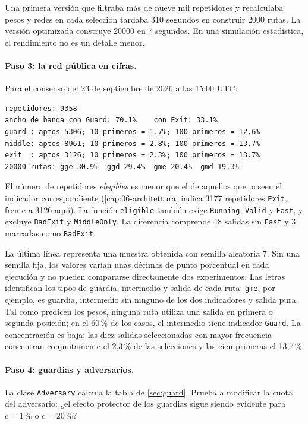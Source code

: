 Una primera versión que filtraba más de nueve mil repetidores y recalculaba pesos y redes en cada selección tardaba 310 segundos en construir \num{2000} rutas. La versión optimizada construye \num{20000} en 7 segundos. En una simulación estadística, el rendimiento no es un detalle menor.

\paragraph{Paso 3: la red pública en cifras.} Para el consenso del 23 de septiembre de 2026 a las 15:00 UTC:
\begin{lstlisting}[numbers=none]
repetidores: 9358
ancho de banda con Guard: 70.1%    con Exit: 33.1%
guard : aptos 5306; 10 primeros = 1.7%; 100 primeros = 12.6%
middle: aptos 8961; 10 primeros = 2.8%; 100 primeros = 13.7%
exit  : aptos 3126; 10 primeros = 2.3%; 100 primeros = 13.7%
20000 rutas: gge 30.9%  ggd 29.4%  gme 20.4%  gmd 19.3%
\end{lstlisting}

El número de repetidores \emph{elegibles} es menor que el de aquellos que poseen el indicador correspondiente (\cref{cap:06-architettura} indica 3177 repetidores \texttt{Exit}, frente a 3126 aquí). La función \texttt{eligible} también exige \texttt{Running}, \texttt{Valid} y \texttt{Fast}, y excluye \texttt{BadExit} y \texttt{MiddleOnly}. La diferencia comprende 48 salidas sin \texttt{Fast} y 3 marcadas como \texttt{BadExit}.

La última línea representa una muestra obtenida con semilla aleatoria 7. Sin una semilla fija, los valores varían unas décimas de punto porcentual en cada ejecución y no pueden compararse directamente dos experimentos. Las letras identifican los tipos de guardia, intermedio y salida de cada ruta: \texttt{gme}, por ejemplo, es guardia, intermedio sin ninguno de los dos indicadores y salida pura. Tal como predicen los pesos, ninguna ruta utiliza una salida en primera o segunda posición; en el 60\,\% de los casos, el intermedio tiene indicador \texttt{Guard}. La concentración es baja: las diez salidas seleccionadas con mayor frecuencia concentran conjuntamente el 2,3\,\% de las selecciones y las cien primeras el 13,7\,\%.

\paragraph{Paso 4: guardias y adversarios.} La clase \texttt{Adversary} calcula la tabla de \cref{sec:guard}. Prueba a modificar la cuota del adversario: ¿el efecto protector de los guardias sigue siendo evidente para $c=1\,\%$ o $c=20\,\%$?

